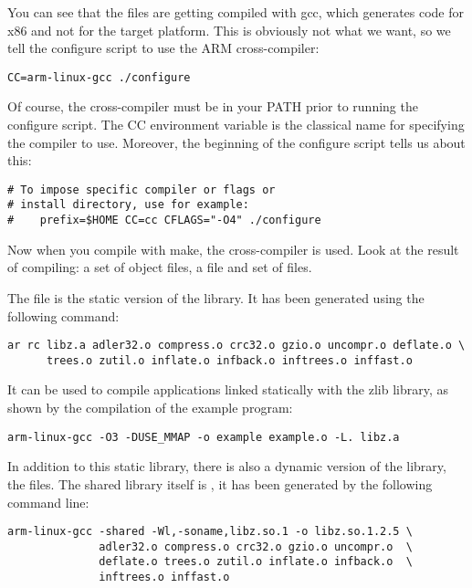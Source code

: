 You can see that the files are getting compiled with gcc, which
generates code for x86 and not for the target platform. This is
obviously not what we want, so we tell the configure script to use the
ARM cross-compiler:

\begin{verbatim}
CC=arm-linux-gcc ./configure
\end{verbatim}

Of course, the  cross-compiler must be in your
PATH prior to running the configure script. The CC environment
variable is the classical name for specifying the compiler to
use. Moreover, the beginning of the configure script tells us about
this:

\begin{verbatim}
# To impose specific compiler or flags or
# install directory, use for example:
#    prefix=$HOME CC=cc CFLAGS="-O4" ./configure
\end{verbatim}

Now when you compile with make, the cross-compiler is used. Look at
the result of compiling: a set of object files, a file 
and set of  files.

The  file is the static version of the library. It has
been generated using the following command:

\begin{verbatim}
ar rc libz.a adler32.o compress.o crc32.o gzio.o uncompr.o deflate.o \
      trees.o zutil.o inflate.o infback.o inftrees.o inffast.o
\end{verbatim}

It can be used to compile applications linked statically with the zlib
library, as shown by the compilation of the example program:

\begin{verbatim}
arm-linux-gcc -O3 -DUSE_MMAP -o example example.o -L. libz.a
\end{verbatim}

In addition to this static library, there is also a dynamic version of
the library, the \code{libz.so*} files. The shared library itself is
\code{libz.so.1.2.5}, it has been generated by the following command
line:

\begin{verbatim}
arm-linux-gcc -shared -Wl,-soname,libz.so.1 -o libz.so.1.2.5 \
              adler32.o compress.o crc32.o gzio.o uncompr.o  \
              deflate.o trees.o zutil.o inflate.o infback.o  \
              inftrees.o inffast.o
\end{verbatim}

